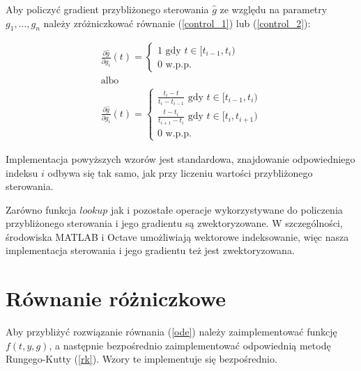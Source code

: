 \documentclass[licencjacka]{pracamgr}
\begin{document}
Aby policzyć gradient przybliżonego sterowania $\hat{g}$ ze względu na parametry $g_1,\ldots,g_n$ należy zróżniczkować równanie (\ref{control_1}) lub (\ref{control_2}):

\begin{gather}
  \frac{\partial \hat{g}}{\partial g_i}(t) = \begin{cases} 1 \text{ gdy } t \in [t_{i-1}, t_i) \\ 0 \text{ w.p.p.} \end{cases} \label{dcontrol_1}\\
  \nonumber \text{albo}\\
  \frac{\partial \hat{g}}{\partial g_i}(t) = \begin{cases} \frac{t_i - t}{t_i - t_{i-1}} \text{ gdy } t \in [t_{i-1}, t_i) \\ \frac{t - t_i}{t_{i+1} - t_i} \text{ gdy } t \in [t_{i}, t_{i+1}) \\ 0 \text{ w.p.p.} \end{cases} \label{dcontrol_2}
\end{gather}

Implementacja powyższych wzorów jest standardowa, znajdowanie odpowiedniego indeksu $i$ odbywa się tak samo, jak przy liczeniu wartości przybliżonego sterowania.

Zarówno funkcja $lookup$ jak i pozostałe operacje wykorzystywane do policzenia przybliżonego sterowania i jego gradientu są zwektoryzowane. W szczególności, środowiska MATLAB i Octave umożliwiają wektorowe indeksowanie, więc nasza implementacja sterowania i jego gradientu też jest zwektoryzowana.

\section{Równanie różniczkowe}\label{subsec_rrz}
Aby przybliżyć rozwiązanie równania (\ref{ode}) należy zaimplementować funkcję $f(t,y,g)$, a następnie bezpośrednio zaimplementować odpowiednią metodę Rungego-Kutty (\ref{rk}). Wzory te implementuje się bezpośrednio.
\end{document}
